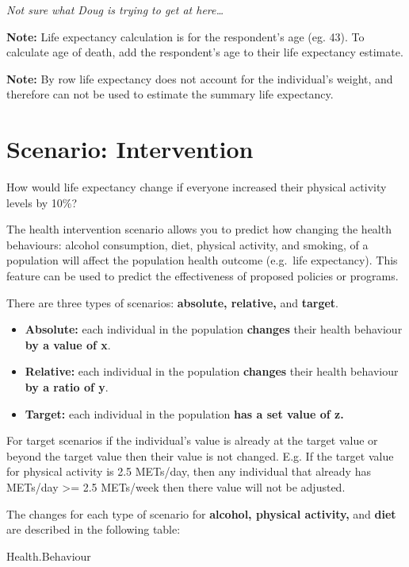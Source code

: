 \documentclass[]{book}
\providecommand{\tightlist}{%
  \setlength{\itemsep}{0pt}\setlength{\parskip}{0pt}}
\begin{document}
\emph{Not sure what Doug is trying to get at here\ldots{}}

\textbf{Note:} Life expectancy calculation is for the respondent's age
(eg. 43). To calculate age of death, add the respondent's age to their
life expectancy estimate.

\textbf{Note:} By row life expectancy does not account for the
individual's weight, and therefore can not be used to estimate the
summary life expectancy.

\section{Scenario: Intervention}\label{scenario-intervention}

How would life expectancy change if everyone increased their physical
activity levels by 10\%?

The health intervention scenario allows you to predict how changing the
health behaviours: alcohol consumption, diet, physical activity, and
smoking, of a population will affect the population health outcome
(e.g.~life expectancy). This feature can be used to predict the
effectiveness of proposed policies or programs.

There are three types of scenarios: \textbf{absolute, relative,} and
\textbf{target}.

\begin{itemize}
\tightlist
\item
  \textbf{Absolute:} each individual in the population \textbf{changes}
  their health behaviour \textbf{by a value of x}.
\item
  \textbf{Relative:} each individual in the population \textbf{changes}
  their health behaviour \textbf{by a ratio of y}.
\item
  \textbf{Target:} each individual in the population \textbf{has a set
  value of z.}
\end{itemize}

For target scenarios if the individual's value is already at the target
value or beyond the target value then their value is not changed. E.g.
If the target value for physical activity is 2.5 METs/day, then any
individual that already has METs/day \textgreater{}= 2.5 METs/week then
there value will not be adjusted.

The changes for each type of scenario for \textbf{alcohol, physical
activity,} and \textbf{diet} are described in the following table:

Health.Behaviour
\end{document}
